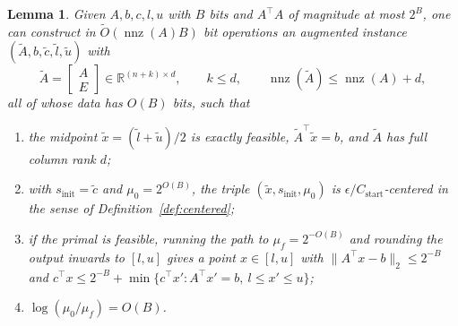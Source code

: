 \documentclass[11pt]{article}
\newtheorem{lemma}{Lemma}[section]
\newcommand{\R}{\mathbb R}
\newcommand{\nnz}{\operatorname{nnz}}
\renewcommand{\O}{\widetilde O}
\begin{document}
\begin{lemma}
\label{lem:initialization}
Given $A, b, c, l, u$ with
$B$ bits and
$A^\top A$ of magnitude at most
$2^{B}$, one can construct in
$\O(\nnz(A) B)$ bit operations an augmented instance
$(\widetilde{A}, b, \widetilde{c}, \widetilde{l}, \widetilde{u})$ with
\[
\widetilde{A}
=
\begin{bmatrix} A \\ E \end{bmatrix} \in \R^{(n + k) \times d},
\qquad
k \le d,
\qquad
\nnz(\widetilde{A}) \le \nnz(A) + d,
\]
all of whose data has $O(B)$ bits, such that
\begin{enumerate}
\item \label{itm:initialization:1} the midpoint
  $\widetilde{x} = (\widetilde{l} + \widetilde{u}) / 2$ is exactly
  feasible, $\widetilde{A}^\top \widetilde{x} = b$, and
  $\widetilde{A}$ has full column rank
  $d$;
\item \label{itm:initialization:2} with
  $s_{\mathrm{init}} = \widetilde{c}$ and
  $\mu_0 = 2^{O(B)}$, the triple
  $(\widetilde{x}, s_{\mathrm{init}}, \mu_0)$ is
  $\epsilon / C_{\mathrm{start}}$-centered in the sense of
  Definition~\ref{def:centered};
\item \label{itm:initialization:3} if the primal is
  feasible, running the path to
  $\mu_f = 2^{-O(B)}$ and rounding the output inwards to
  $[l, u]$ gives a point
  $x \in [l, u]$ with
  $\|A^\top x - b\|_2 \le 2^{-B}$ and
  $c^\top x \le 2^{-B} + \min\{ c^\top x' : A^\top x' = b,\ l \le x' \le u \}$;
\item \label{itm:initialization:4} $\log(\mu_0 / \mu_f) = O(B)$.
\end{enumerate}
\end{lemma}
\end{document}
